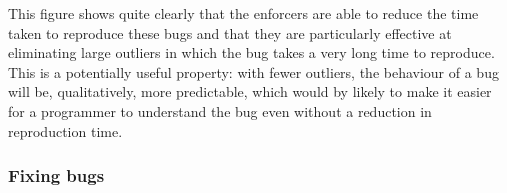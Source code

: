 \begin{sanefig}
  \caption{CDF of time taken to reproduce the bugs in the artificial
    test programs, with and without \glspl{bugenforcer}, and some
    summary statistics.  Note log scale.  All times in seconds.  Means
    calculated ignoring timeouts.  Grey region gives a 90\% confidence
    interval, computed using the Dvoretsky-Kiefer-Wolfowitz-Massart
    (DKWM) inequality .  Note that DKWM
    confidence intervals are curve-wise rather than point-wise
    i.e. there is a 90\% confidence that the entire curve is within
    the shaded region, rather than that any given point is.}
\end{sanefig}

This figure shows quite clearly that the enforcers are able to reduce
the time taken to reproduce these bugs and that they are particularly
effective at eliminating large outliers in which the bug takes a very
long time to reproduce.  This is a potentially useful property: with
fewer outliers, the behaviour of a bug will be, qualitatively, more
predictable, which would by likely to make it easier for a programmer
to understand the bug even without a reduction in reproduction time.

\subsubsection{Fixing bugs}

